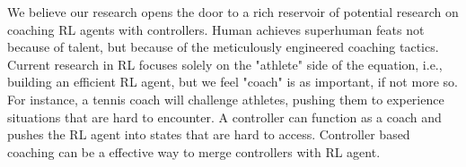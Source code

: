 \documentclass[journal]{IEEEtran}
\begin{document}
We believe our research opens the door to a rich reservoir of potential research on coaching RL agents with controllers. Human achieves superhuman feats not because of talent, but because of the meticulously engineered coaching tactics. Current research in RL focuses solely on the "athlete" side of the equation, i.e., building an efficient RL agent, but we feel "coach" is as important, if not more so.  For instance, a tennis coach will challenge athletes, pushing them to experience situations that are hard to encounter. A controller can function as a coach and pushes the RL agent into states that are hard to access. Controller based coaching can be a effective way to merge controllers with RL agent. 



\end{document}
